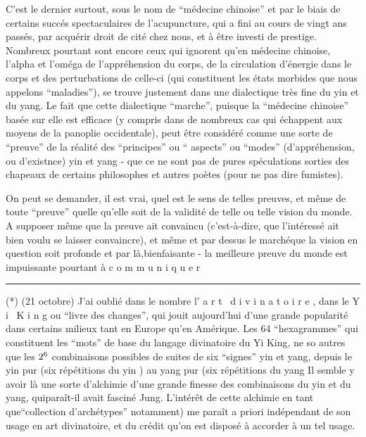 C'est le dernier surtout, sous le nom de ``médecine chinoise'' et par le biais de certains succés spectaculaires de l'acupuncture, qui a fini au cours de vingt ans passés, par acquérir droit de cité chez nous, et à être investi de prestige. Nombreux pourtant sont encore ceux qui ignorent qu'en médecine chinoise, l'alpha et l'oméga de l'appréhension du corps, de la circulation d'énergie dans le corps et des perturbations de celle-ci (qui constituent les états morbides que nous appelons ``maladies''), se trouve justement dans une dialectique très fine du yin et du yang. Le fait que cette dialectique ``marche'', puisque la ``médecine chinoise'' basée sur elle est efficace (y compris dans de nombreux cas qui échappent aux moyens de la panoplie occidentale), peut être considéré comme une sorte de ``preuve'' de la réalité des ``principes'' ou `` aspects'' ou ``modes'' (d'appréhension, ou d'existnce) yin et yang - que ce ne sont pas de pures spéculations sorties des chapeaux de certains philosophes et autres poètes (pour ne pas dire fumistes).

On peut se demander, il est vrai, quel est le sens de telles preuves, et même de toute ``preuve'' quelle qu'elle soit de la validité de telle ou telle vision du monde. A supposer même que la preuve ait convaincu (c'est-à-dire, que l'intéressé ait bien voulu se laisser convaincre), et même et par dessus le marché\handwritten{,}que la vision en question soit profonde et par là,bienfaisante - la meilleure preuve du monde est impuissante pourtant à c o m m u n i q u e r

\noindent\rule{.22\linewidth}{.4pt}\par
(*) (21 octobre) J'ai oublié dans le nombre l' a r t \ d i v i n a t o i r e , dans le Y i \ K i n g ou ``livre des changes'', qui jouit aujourd'hui d'une grande popularité dans certains milieux tant en Europe qu'en Amérique. Les 64 ``hexagrammes'' qui constituent les ``mots'' de base du langage divinatoire du Yi King, ne so autres que les $2^{6}$ combinaisons possibles de suites de six ``signes'' yin et yang, depuis le yin pur (six répétitions du yin ) au yang pur (six répétitions du yang Il semble y avoir là une sorte d'alchimie d'une grande finesse des combinaisons du yin et du yang, qui\handwritten{(}paraît-il\handwritten{)} avait fasciné Jung. L'intérêt de cette alchimie \handwritten{(}en tant que``collection d'archétypes'' notamment) me paraît a priori indépendant de son usage en art divinatoire, et du crédit qu'on est disposé à accorder à un tel usage.

